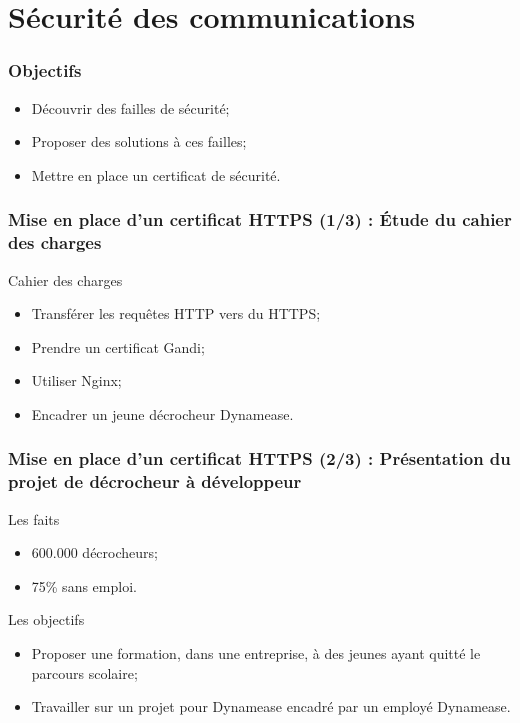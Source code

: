 \section{Sécurité des communications}
\author{Kévin Moreau}


\begin{frame}
	\frametitle{Objectifs}

	 \begin{itemize}
      \item Découvrir des failles de sécurité;
      \item Proposer des solutions à ces failles;
      \item Mettre en place un certificat de sécurité.
	 \end{itemize}
\end{frame}

\begin{frame}
	\frametitle{Mise en place d'un certificat HTTPS (1/3) : Étude du cahier des charges}

	\begin{block}{Cahier des charges}
	 \begin{itemize}
      \item Transférer les requêtes HTTP vers du HTTPS;
      \item Prendre un certificat Gandi;
      \item Utiliser Nginx;
      \item Encadrer un jeune décrocheur Dynamease.
	 \end{itemize}
	\end{block}
\end{frame}

\begin{frame}
	\frametitle{Mise en place d'un certificat HTTPS (2/3) : Présentation du projet de décrocheur à développeur}

	\begin{block}{Les faits}
		\begin{itemize}
	 		\item 600.000 décrocheurs;
	 		\item 75\% sans emploi.
	 	\end{itemize}
	\end{block}

	\begin{block}{Les objectifs}
		\begin{itemize}
	 		\item Proposer une formation, dans une entreprise, à des jeunes ayant quitté le parcours scolaire;
	 		\item Travailler sur un projet pour Dynamease encadré par un employé Dynamease.
	 	\end{itemize}
	\end{block}
\end{frame}

